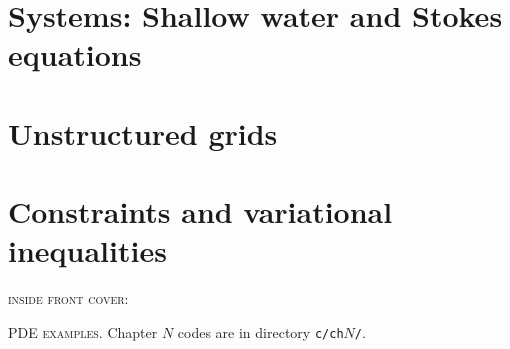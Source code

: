 \documentclass{tufte-book}
\newcommand{\CODELOC}{}  %
\newcommand{\stubinput}[2]{}
\newcommand{\stubinput}[2]{\vspace{5cm} \centerline{\LARGE Percent completed:  \Huge #2\%.} \vfill}
\theoremstyle{definition}
\begin{document}
\chapter{Systems: Shallow water and Stokes equations}
\label{chap:sy}
\renewcommand{\CODELOC}{ch10/}
\stubinput{chaps/stokes.tex}{5}

\chapter{Unstructured grids}
\label{chap:dp}
\renewcommand{\CODELOC}{ch11/}
\stubinput{chaps/dmplex.tex}{0}

\chapter{Constraints and variational inequalities}
\label{chap:co}
\renewcommand{\CODELOC}{ch12/}
\stubinput{chaps/constrained.tex}{20}
%


\backmatter




\clearpage

\newcommand{\tblockeqncode}[3]{
\begin{tabular}[t]{l} #1 \\ \quad {\normalsize \texttt{#3}} \\ \qquad \fbox{\small #2} \end{tabular}
}
\newcommand{\tblockcode}[2]{
\begin{tabular}[t]{l} #1 \\ \quad {\normalsize \texttt{#2}} \end{tabular}
}
\newcommand{\tblock}[1]{
\begin{tabular}[t]{l} #1 \end{tabular}
}

\clearpage
\thispagestyle{empty}
\noindent \textsc{inside front cover:}

\vfill
{\large \noindent \textsc{PDE examples}.} \quad Chapter $N$ codes are in directory \texttt{c/ch}$N$\texttt{/}.
\end{document}

